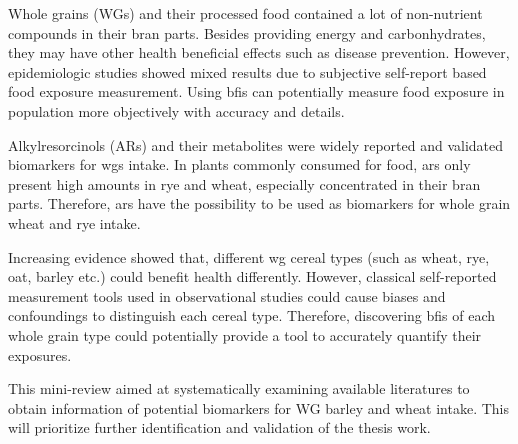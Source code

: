 Whole grains (WGs) and their processed food contained a lot of non-nutrient compounds in their bran parts. Besides providing energy and carbonhydrates, they may have other health beneficial effects such as disease prevention. However, epidemiologic studies showed mixed results due to subjective self-report based food exposure measurement\cite{ISI:000447355100002}. Using \acrfull{bfis} can potentially measure food exposure in population more objectively with accuracy and details\cite{Scalbert2014}.

Alkylresorcinols (ARs) and their metabolites were widely reported and validated biomarkers for \acrshort{wgs} intake. 
In plants commonly consumed for food, \acrshort{ars} only present high amounts in rye and wheat, especially concentrated in their bran parts\cite{arreview2004}. Therefore, \acrshort{ars} have the possibility to be used as biomarkers for whole grain wheat and rye intake.


Increasing evidence showed that, different \acrshort{wg} cereal types (such as wheat, rye, oat, barley etc.) could benefit health differently. 
However, classical self-reported measurement tools used in observational studies could cause biases and confoundings to distinguish each cereal type.
Therefore, discovering \acrshort{bfis} of each whole grain type could potentially provide a tool to accurately quantify their exposures. 

This mini-review aimed at systematically examining available literatures to obtain information of potential biomarkers for WG barley and wheat intake. This will prioritize further identification and validation of the thesis work.

